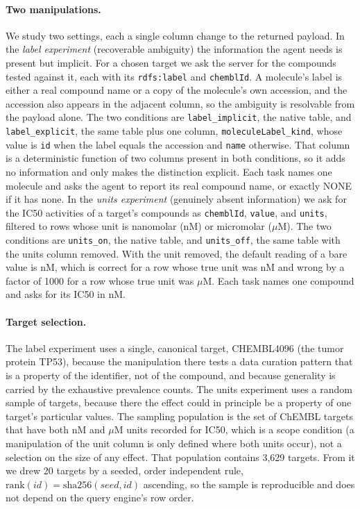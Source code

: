 \documentclass[sigconf]{ceurart}
\begin{document}
\paragraph{Two manipulations.}
We study two settings, each a single column change to the returned payload. In the
\emph{label experiment} (recoverable ambiguity) the information the agent needs is present
but implicit. For a chosen target we ask the server for the compounds tested
against it, each with its \texttt{rdfs:label} and \texttt{chemblId}. A molecule's
label is either a real compound name or a copy of the molecule's own accession, and
the accession also appears in the adjacent column, so the ambiguity is resolvable
from the payload alone. The two conditions are \texttt{label\_implicit}, the native
table, and \texttt{label\_explicit}, the same table plus one column,
\texttt{moleculeLabel\_kind}, whose value is \texttt{id} when the label equals the
accession and \texttt{name} otherwise. That column is a deterministic function of
two columns present in both conditions, so it adds no information and only makes the
distinction explicit. Each task names one molecule and asks the agent to report its
real compound name, or exactly NONE if it has none. In the \emph{units experiment}
(genuinely absent information) we ask for the IC50 activities of a target's
compounds as \texttt{chemblId}, \texttt{value}, and \texttt{units}, filtered to
rows whose unit is nanomolar (nM) or micromolar ($\mu$M). The two conditions are
\texttt{units\_on}, the native table, and \texttt{units\_off}, the same table with
the units column removed. With the unit removed, the default reading of a bare
value is nM, which is correct for a row whose true unit was nM and wrong by a factor
of 1000 for a row whose true unit was $\mu$M. Each task names one compound and asks for
its IC50 in nM.

\paragraph{Target selection.}
The label experiment uses a single, canonical target, CHEMBL4096 (the tumor protein TP53),
because the manipulation there tests a data curation pattern that is a property of
the identifier, not of the compound, and because generality is carried by the
exhaustive prevalence counts. The units experiment uses a random sample of targets,
because there the effect could in principle be a property of one target's
particular values. The sampling population is the set of ChEMBL targets that have
both nM and $\mu$M units recorded for IC50, which is a scope condition (a manipulation
of the unit column is only defined where both units occur), not a selection on the
size of any effect. That population contains 3{,}629 targets. From it we drew 20
targets by a seeded, order independent rule, $\mathrm{rank}(id) =
\mathrm{sha256}(seed, id)$ ascending, so the sample is reproducible and does not
depend on the query engine's row order.
\end{document}
